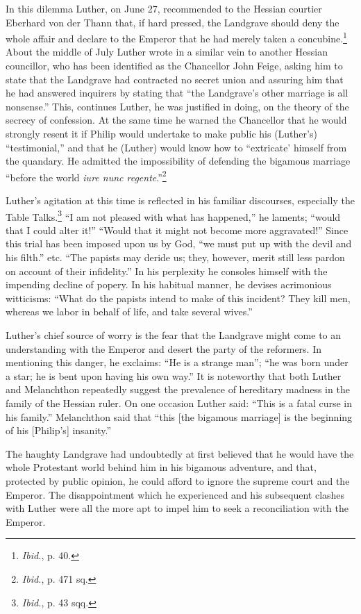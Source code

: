 In this dilemma Luther, on June 27, recommended to the Hessian
courtier Eberhard von der Thann that, if hard pressed, the Landgrave
should deny the whole affair and declare to the Emperor that he had
merely taken a concubine.\footnote{\textit{Ibid.}, p. 40.}
 About the middle of July Luther wrote
in a similar vein to another Hessian councillor, who has been identified
as the Chancellor John Feige, asking him to state that the Landgrave had
contracted no secret union and assuring him that he had
answered inquirers by stating that “the Landgrave’s other marriage is
all nonsense.” This, continues Luther, he was justified in doing, on
the theory of the secrecy of confession. At the same time he warned
the Chancellor that he would strongly resent it if Philip would undertake
to make public his (Luther’s) “testimonial,” and that he (Luther) would
know how to “extricate’ himself from the quandary. He
admitted the impossibility of defending the bigamous marriage “before
the world \textit{iure nunc regente}.”\footnote{\textit{Ibid.}, p. 471 sq.}


Luther’s agitation at this time is reflected in his familiar discourses,
especially the Table Talks.\footnote{\textit{Ibid.}, p. 43 sqq.}
“I am not pleased with what has happened,” he
laments; “would that I could alter it!” “Would that it might not become
more aggravated!” Since this trial has been imposed upon us by God, “we
must put up with the devil and his filth.” etc. “The papists may deride us;
they, however, merit still less pardon on account of their infidelity.” In his
perplexity he consoles himself with the impending decline of popery. In his
habitual manner, he devises acrimonious witticisms: “What do the papists
intend to make of this incident? They kill men, whereas we labor in behalf
of life, and take several wives.”

Luther’s chief source of worry is the fear that the Landgrave might come
to an understanding with the Emperor and desert the party of the reformers.
In mentioning this danger, he exclaims: “He is a strange man”; “he was born
under a star; he is bent upon having his own way.” It is noteworthy that
both Luther and Melanchthon repeatedly suggest the prevalence of hereditary
madness in the family of the Hessian ruler. On one occasion Luther
said: “This is a fatal curse in his family.” Melanchthon said that “this [the
bigamous marriage] is the beginning of his [Philip’s] insanity.”

The haughty Landgrave had undoubtedly at first believed that he would
have the whole Protestant world behind him in his bigamous adventure, and
that, protected by public opinion, he could afford to ignore the supreme
court and the Emperor. The disappointment which he experienced and his
subsequent clashes with Luther were all the more apt to impel him to seek
a reconciliation with the Emperor.


